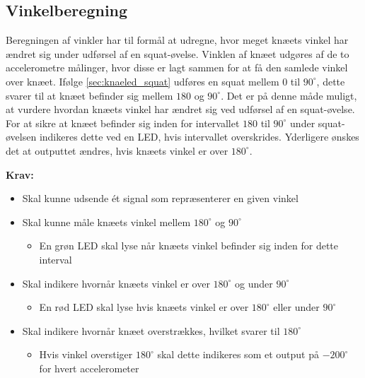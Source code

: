 \subsection{Vinkelberegning}
Beregningen af vinkler har til formål at udregne, hvor meget knæets vinkel  har ændret sig under udførsel af en squat-øvelse. Vinklen af knæet udgøres af de to accelerometre målinger, hvor disse er lagt sammen for at få den samlede vinkel over knæet.
Ifølge \autoref{sec:knaeled_squat} udføres en squat mellem $0$ til $90^{\circ}$, dette svarer til at knæet befinder sig mellem $180$ og $90^{\circ}$. Det er på denne måde muligt, at vurdere hvordan knæets vinkel har ændret sig ved udførsel af en squat-øvelse. 
For at sikre at knæet befinder sig inden for intervallet $180$ til $90^{\circ}$ under squat-øvelsen indikeres dette ved en LED, hvis intervallet overskrides. Yderligere ønskes det at outputtet ændres, hvis knæets vinkel er  over $180^{\circ}$.

 
\vspace{3mm}
\textbf{Krav:}
\begin{itemize}
\item Skal kunne udsende ét signal som repræsenterer en given vinkel
\item Skal kunne måle knæets vinkel mellem $180^{\circ}$ og $90^{\circ}$
\begin{itemize}
\item En grøn LED skal lyse når knæets vinkel befinder sig inden for dette interval
\end{itemize}
\item Skal indikere hvornår knæets vinkel er over $180^{\circ}$ og under $90^{\circ}$
\begin{itemize}
\item En rød LED skal lyse hvis knæets vinkel er over $180^{\circ}$ eller under $90^{\circ}$
\end{itemize}
\item Skal indikere hvornår knæet overstrækkes, hvilket svarer til $180^{\circ}$
\begin{itemize}
\item Hvis vinkel overstiger $180^{\circ}$ skal dette indikeres som et output på $-200^{\circ}$ for hvert accelerometer
\end{itemize}
\end{itemize}